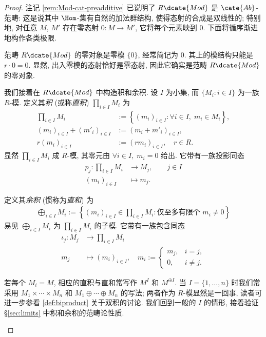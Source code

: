 \begin{proof}
	注记 \ref{rem:Mod-cat-preadditive} 已说明了 $R\dcate{Mod}$ 是 $\cate{Ab}$-范畴: 这是说其中 $\Hom$-集有自然的加法群结构, 使得态射的合成是双线性的; 特别地, 对任意 $M$, $M'$ 存在零态射 $0: M \to M'$, 它将每个元素映到 $0$. 下面将循序渐进地构作各类极限.

	\begin{asparaenum}
		\item 范畴 $R\dcate{Mod}$ 的零对象是零模 $\{0\}$, 经常简记为 $0$. 其上的模结构只能是 $r \cdot 0 = 0$. 显然, 出入零模的态射恰好是零态射, 因此它确实是范畴 $R\dcate{Mod}$ 的零对象.

		\item 我们接着在 $R\dcate{Mod}$ 中构造积和余积. 设 $I$ 为小集, 而 $\{M_i : i \in I\}$ 为一族 $R$-模. 定义其\emph{积} (或称\emph{直积}) $\prod_{i \in I} M_i$ 为
		\begin{align*}
			\prod_{i \in I} M_i & := \left\{ (m_i)_{i \in I} : \forall i \in I, \; m_i \in M_i \right\}, \\
			(m_i)_{i \in I} + (m'_i)_{i \in I} & := (m_i + m'_i)_{i \in I}, \\
			r(m_i)_{i \in I} & := (rm_i)_{i \in I}, \quad r \in R.
		\end{align*}
		显然 $\prod_{i \in I} M_i$ 成 $R$-模, 其零元由 $\forall i \in I, \; m_i = 0$ 给出. 它带有一族投影同态
		\begin{align*}
			p_j: \prod_{i \in I} M_i & \longrightarrow M_j, \qquad j \in I \\
			(m_i)_{i \in I} & \longmapsto m_j.
		\end{align*}

		定义其\emph{余积} (惯称为\emph{直和}) 为 
		\begin{gather*}
			\bigoplus_{i \in I} M_i := \left\{ (m_i)_{i \in I} \in \prod_{i \in I} M_i : \text{仅至多有限个 } m_i \neq 0 \right\}
		\end{gather*}
		易见 $\bigoplus_{i \in I} M_i$ 为 $\prod_{i \in I} M_i$ 的子模. 它带有一族包含同态
		\begin{align*}
			\iota_j: M_j & \longrightarrow \prod_{i \in I} M_i \\
			m_j & \longmapsto (m_i)_{i \in I}, \quad m_i :=
			\begin{cases}
				m_j, & i=j, \\
				0, & i \neq j.
			\end{cases}
		\end{align*}

		若每个 $M_i = M$, 相应的直积与直和常写作 $M^I$ 和 $M^{\oplus I}$. 当 $I=\{1, \ldots, n\}$ 时我们常采用 $M_1 \times \cdots \times M_n$ 和 $M_1 \oplus \cdots \oplus M_n$ 的写法; 两者作为 $R$-模显然是一回事, 读者可进一步参看 \ref{def:biproduct} 关于双积的讨论. 我们回到一般的 $I$ 的情形, 接着验证 \S\ref{sec:limits} 中积和余积的范畴论性质.


\end{asparaenum}
\end{proof}
